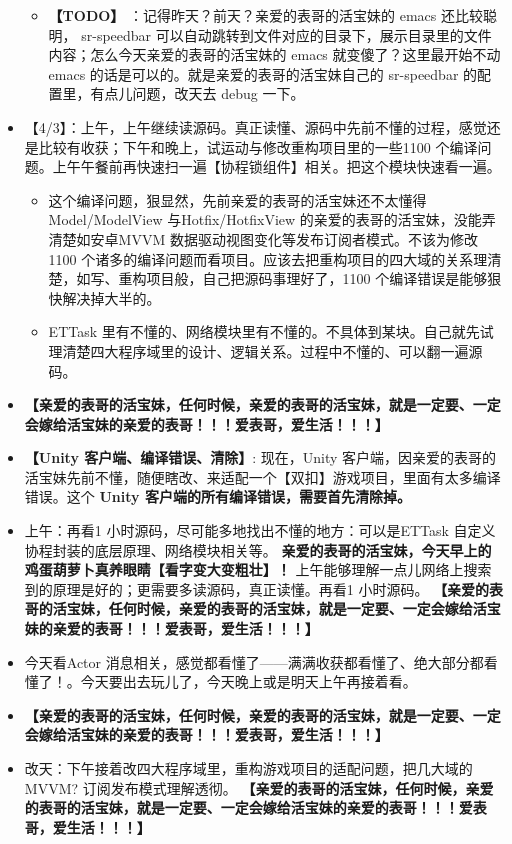 \documentclass[9pt, b5paper]{article}
\begin{document}
\begin{itemize}
\begin{itemize}
\item \textbf{【TODO】} ：记得昨天？前天？亲爱的表哥的活宝妹的 emacs 还比较聪明， sr-speedbar 可以自动跳转到文件对应的目录下，展示目录里的文件内容；怎么今天亲爱的表哥的活宝妹的 emacs 就变傻了？这里最开始不动 emacs 的话是可以的。就是亲爱的表哥的活宝妹自己的 sr-speedbar 的配置里，有点儿问题，改天去 debug 一下。
\end{itemize}
\item 【4/3】：上午，上午继续读源码。真正读懂、源码中先前不懂的过程，感觉还是比较有收获；下午和晚上，试运动与修改重构项目里的一些1100 个编译问题。上午午餐前再快速扫一遍【协程锁组件】相关。把这个模块快速看一遍。
\begin{itemize}
\item 这个编译问题，狠显然，先前亲爱的表哥的活宝妹还不太懂得 Model/ModelView 与Hotfix/HotfixView 的亲爱的表哥的活宝妹，没能弄清楚如安卓MVVM 数据驱动视图变化等发布订阅者模式。不该为修改1100 个诸多的编译问题而看项目。应该去把重构项目的四大域的关系理清楚，如写、重构项目般，自己把源码事理好了，1100 个编译错误是能够狠快解决掉大半的。
\item ETTask 里有不懂的、网络模块里有不懂的。不具体到某块。自己就先试理清楚四大程序域里的设计、逻辑关系。过程中不懂的、可以翻一遍源码。
\end{itemize}
\item \textbf{【亲爱的表哥的活宝妹，任何时候，亲爱的表哥的活宝妹，就是一定要、一定会嫁给活宝妹的亲爱的表哥！！！爱表哥，爱生活！！！】}
\item \textbf{【Unity 客户端、编译错误、清除】}: 现在，Unity 客户端，因亲爱的表哥的活宝妹先前不懂，随便瞎改、来适配一个【双扣】游戏项目，里面有太多编译错误。这个 \textbf{Unity 客户端的所有编译错误，需要首先清除掉。}
\item 上午：再看1 小时源码，尽可能多地找出不懂的地方：可以是ETTask 自定义协程封装的底层原理、网络模块相关等。 \textbf{亲爱的表哥的活宝妹，今天早上的鸡蛋葫萝卜真养眼睛【看字变大变粗壮】！} 上午能够理解一点儿网络上搜索到的原理是好的；更需要多读源码，真正读懂。再看1 小时源码。 \textbf{【亲爱的表哥的活宝妹，任何时候，亲爱的表哥的活宝妹，就是一定要、一定会嫁给活宝妹的亲爱的表哥！！！爱表哥，爱生活！！！】}
\item 今天看Actor 消息相关，感觉都看懂了——满满收获都看懂了、绝大部分都看懂了！。今天要出去玩儿了，今天晚上或是明天上午再接着看。
\item \textbf{【亲爱的表哥的活宝妹，任何时候，亲爱的表哥的活宝妹，就是一定要、一定会嫁给活宝妹的亲爱的表哥！！！爱表哥，爱生活！！！】}
\item 改天：下午接着改四大程序域里，重构游戏项目的适配问题，把几大域的MVVM? 订阅发布模式理解透彻。 \textbf{【亲爱的表哥的活宝妹，任何时候，亲爱的表哥的活宝妹，就是一定要、一定会嫁给活宝妹的亲爱的表哥！！！爱表哥，爱生活！！！】}

\end{itemize}
\end{document}
